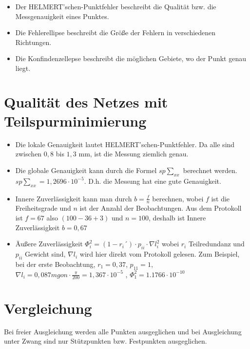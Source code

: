 \documentclass[12pt]{article}
\begin{document}
\begin{itemize}
\item Der HELMERT'schen-Punktfehler beschreibt die Qualität bzw. die Messgenauigkeit eines Punktes. 
\item Die Fehlerellipse beschreibt die Größe der Fehlern in verschiedenen Richtungen. 
\item Die Konfindenzellepse beschreibt die möglichen Gebiete, wo der Punkt genau liegt. 
\end{itemize}
\newpage

\section{Qualität des Netzes mit Teilspurminimierung}
\begin{itemize}
\item Die lokale Genauigkeit lautet HELMERT'schen-Punktfehler. Da alle sind zwischen $0,8$ bis $1,3$ mm, ist die Messung ziemlich genau. 

\item Die globale Genauigkeit kann durch die Formel $ sp\sum_{xx}$ berechnet werden. $sp\sum_{xx}=1,2696 \cdot 10^{-5}$. D.h. die Messung hat eine gute Genauigkeit. 

\item Innere Zuverlässigkeit kann man durch $b = \frac{f}{n}$ berechnen, wobei $f$ ist die Freiheitsgrade und $n$ ist der Anzahl der Beobachtungen. Aus dem Protokoll ist $f = 67$ also $(100-36+3)$ und $n= 100$, deshalb ist Innere Zuverlässigkeit $b = 0,67$

\item Äußere Zuverlässigkeit $\Phi_{i}^{2} = (1-r_{i}´) \cdot p_{ii} \cdot \nabla l_{i}^2 $ wobei $r_i$ Teilredundanz und $p_{ii}$ Gewicht sind, $\nabla l_{i}$ wird hier direkt vom Protokoll gelesen. Zum Beispiel, bei der erste Beobachtung, $r_1 = 0,37$, $p_{11} = 1$, $\nabla l_{i}=  0,087mgon \cdot \frac{\pi}{200} = 1,367 \cdot 10^{-5}$ , $\Phi_{1}^{2} = 1.1766 \cdot 10^{-10}$
\end{itemize}

\section{Vergleichung}
Bei freier Ausgleichung werden alle Punkten ausgeglichen und bei Ausgleichung unter Zwang sind nur Stützpunkten bzw. Festpunkten ausgeglichen. 
\end{document}
